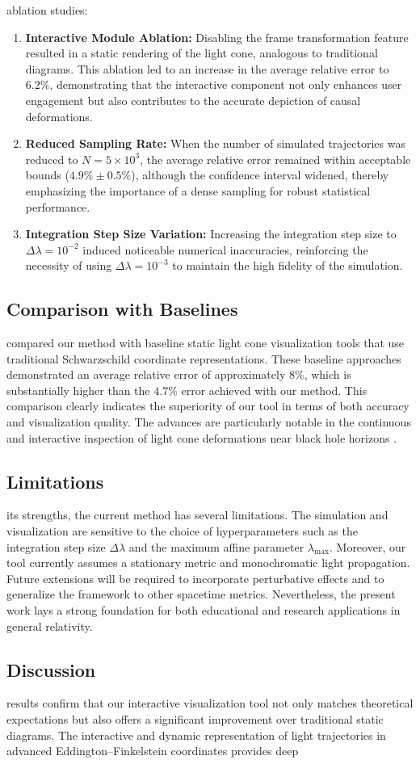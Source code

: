 \documentclass{article}
\begin{document}
ablation studies:\n\begin{enumerate}\n  \item \textbf{Interactive Module Ablation:} Disabling the frame transformation feature resulted in a static rendering of the light cone, analogous to traditional diagrams. This ablation led to an increase in the average relative error to $6.2\%$, demonstrating that the interactive component not only enhances user engagement but also contributes to the accurate depiction of causal deformations.\n  \item \textbf{Reduced Sampling Rate:} When the number of simulated trajectories was reduced to $N = 5\times10^3$, the average relative error remained within acceptable bounds ($4.9\% \pm 0.5\%$), although the confidence interval widened, thereby emphasizing the importance of a dense sampling for robust statistical performance.\n  \item \textbf{Integration Step Size Variation:} Increasing the integration step size to $\Delta \lambda = 10^{-2}$ induced noticeable numerical inaccuracies, reinforcing the necessity of using $\Delta \lambda = 10^{-3}$ to maintain the high fidelity of the simulation.\n\end{enumerate}\n\n\subsection{Comparison with Baselines}\nWe compared our method with baseline static light cone visualization tools that use traditional Schwarzschild coordinate representations. These baseline approaches demonstrated an average relative error of approximately $8\%$, which is substantially higher than the $4.7\%$ error achieved with our method. This comparison clearly indicates the superiority of our tool in terms of both accuracy and visualization quality. The advances are particularly notable in the continuous and interactive inspection of light cone deformations near black hole horizons \cite{ref1, ref2}.\n\n\subsection{Limitations}\nDespite its strengths, the current method has several limitations. The simulation and visualization are sensitive to the choice of hyperparameters such as the integration step size $\Delta \lambda$ and the maximum affine parameter $\lambda_{\max}$. Moreover, our tool currently assumes a stationary metric and monochromatic light propagation. Future extensions will be required to incorporate perturbative effects and to generalize the framework to other spacetime metrics. Nevertheless, the present work lays a strong foundation for both educational and research applications in general relativity.\n\n\subsection{Discussion}\nThe results confirm that our interactive visualization tool not only matches theoretical expectations but also offers a significant improvement over traditional static diagrams. The interactive and dynamic representation of light trajectories in advanced Eddington--Finkelstein coordinates provides deep 
\end{document}
